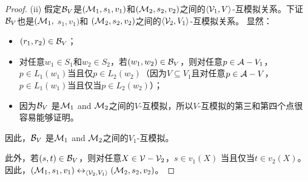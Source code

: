 \begin{proof}
	
 (ii) 假定${\cal B}_{V}$是$({\cal M}_1,s_1,v_1)$和$({\cal M}_2,s_2,v_2)$之间的${{\langle{{\cal V}_1,V}\rangle}}$-互模拟关系。下证${\cal B}_{V}$也是$({\cal M}_1,$ $s_1,v_1)$和 $({\cal M}_2,s_2,v_2)$之间的${{\langle{{\cal V}_2,V_1}\rangle}}$-互模拟关系。
		显然：
		\begin{itemize}
			\item $(r_1, r_2) \in {\cal B}_{V}$；
			\item 对任意$w_1\in S_1$和$w_2\in S_2$，若$(w_1, w_2) \in {\cal B}_{V}$，则对任意$p \in {\cal A} - V_1$，
			$p\in L_1(w_1)$当且仅$p\in L_2(w_2)$（因为$V \subseteq V_1$且对任意$p \in {\cal A} - V$，$p\in L_1(w_1)$当且仅当$p\in L_2(w_2)$）；
			\item 因为${\cal B}_{V}$ 是${\cal M}_1$ and ${\cal M}_2$之间的$V$-互模拟，所以$V$-互模拟的第三和第四个点很容易能够证明。
	\end{itemize}
	因此，${\cal B}_{V}$ 是${\cal M}_1$ and ${\cal M}_2$之间的$V_1$-互模拟。
	
	此外，若$(s,t) \in {\cal B}_V$，则对任意$X\in {\cal V}-{\cal V}_2$，$s \in v_1(X)$ 当且仅当$t \in v_2(X)$。因此，$({\cal M}_1, s_1, v_1) \leftrightarrow_{{\langle{{\cal V}_2,V_1}\rangle}} ({\cal M}_2,s_2,v_2)$。
	

\end{proof}
